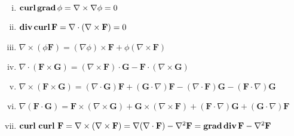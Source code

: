 \bigskip

\begin{enumerate}[(i)]
	\item ${\bf curl\, grad}\, \phi  = \nabla \times \nabla \phi = 0$
	\item ${\bf div\, curl}\, \mathbf F  =\nabla \cdot (\nabla \times 
		\mathbf F) = 0$
	\item $\nabla \times (\phi \mathbf F) = (\nabla \phi) \times \mathbf F
		+ \phi(\nabla \times \mathbf F)$
	\item $\nabla \cdot (\mathbf F \times \mathbf G) =
		(\nabla \times \mathbf F)\cdot \mathbf G - \mathbf F
		\cdot(\nabla \times \mathbf G)$
	\item $\nabla \times( \mathbf F \times \mathbf G) = 
		(\nabla \cdot \mathbf G) \mathbf F + (\mathbf G\cdot \nabla)
		\mathbf F - (\nabla \cdot \mathbf F)\mathbf G 
		-(\mathbf F \cdot \nabla)\mathbf G$
	\item $\nabla(\mathbf F \cdot \mathbf G) = \mathbf F \times 
		(\nabla \times \mathbf G) + \mathbf G \times (\nabla \times
		\mathbf F) + (\mathbf F \cdot \nabla)\mathbf G 
		+(\mathbf G\cdot \nabla)\mathbf F$
\item ${\rm \mbox{${\rm\bf curl\,}$} \, \mbox{${\rm\bf curl\,}$}}\, \mathbf F = 
		\nabla \times (\nabla \times \mathbf F) = \nabla (\nabla \cdot
		\mathbf F) - \nabla^2\mathbf F = 
		{\bf grad\, div\, F} - \nabla^2 \mathbf F$
\end{enumerate}

